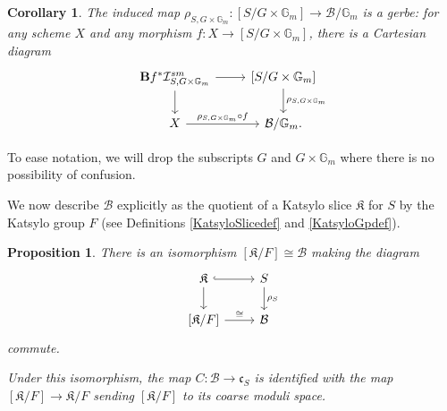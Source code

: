 \documentclass{amsart}
\newtheorem{proposition}[theorem]{Proposition}
\newtheorem{corollary}[theorem]{Corollary}
\theoremstyle{remark}
\numberwithin{theorem}{section}
\numberwithin{equation}{section}
\begin{document}
\begin{corollary}\label{GmEquivStackyCBcor}
    The induced map $\rho_{S,G\times\mathbb{G}_m}:[S/G \times \mathbb{G}_m] \rightarrow  \mathcal B/\mathbb{G}_m$ is a gerbe: for any scheme $X$ and any morphism $f:X \rightarrow [S/G\times \mathbb{G}_m]$, there is a Cartesian diagram
    \begin{equation}\label{GmEquivStackyCB1eqn}
        \begin{tikzcd}
            {\bf B} f^*\mathcal I_{S,G\times \mathbb{G}_m}^{sm}  \arrow[r] \arrow[d] & {[S/G\times \mathbb{G}_m]} \arrow[d,"\rho_{S,G\times \mathbb{G}_m}"] \\
            X \arrow[r, "\rho_{S,G \times \mathbb{G}_m} \circ f"]                  & {\mathcal B/\mathbb{G}_m}.                    
        \end{tikzcd}
    \end{equation}
\end{corollary}

To ease notation, we will drop the subscripts $G$ and $G \times \mathbb{G}_m$ where there is no possibility of confusion.

We now describe $\mathcal B$ explicitly as the quotient of a Katsylo slice $\mathfrak{K}$ for $S$ by the Katsylo group $F$ (see Definitions \ref{KatsyloSlicedef} and \ref{KatsyloGpdef}).

\begin{proposition}\label{StackyCBKQprp}
    There is an isomorphism $[\mathfrak{K}/F] \cong \mathcal B$ making the diagram
    \begin{equation}\label{StackyCBKQeqn}
\begin{tikzcd}
\mathfrak{K} \arrow[r, hook] \arrow[d] & S \arrow[d, "\rho_S"] \\
{[\mathfrak{K}/F]} \arrow[r, "\cong"]  & \mathcal B         
\end{tikzcd}
    \end{equation}
    commute.
    
    Under this isomorphism, the map $C:\mathcal B \rightarrow \mathfrak{c}_S$ is identified with the map $[\mathfrak{K}/F] \rightarrow \mathfrak{K}/F$ sending $[\mathfrak{K}/F]$ to its coarse moduli space.
\end{proposition}
\end{document}
